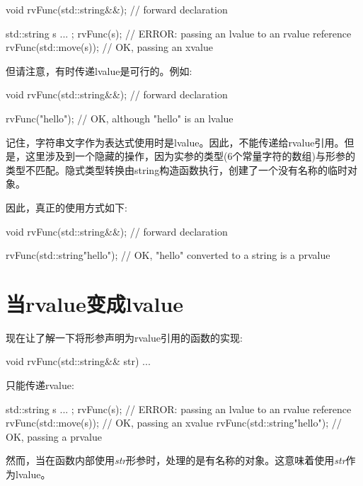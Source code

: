 \begin{codebox}[cpp]
void rvFunc(std::string&&); // forward declaration

std::string s{ ... };
rvFunc(s); // ERROR: passing an lvalue to an rvalue reference
rvFunc(std::move(s)); // OK, passing an xvalue
\end{codebox}

但请注意，有时传递lvalue是可行的。例如:\par

\begin{codebox}[cpp]
void rvFunc(std::string&&); // forward declaration

rvFunc("hello"); // OK, although "hello" is an lvalue
\end{codebox}

记住，字符串文字作为表达式使用时是lvalue。因此，不能传递给rvalue引用。但是，这里涉及到一个隐藏的操作，因为实参的类型(6个常量字符的数组)与形参的类型不匹配。隐式类型转换由string构造函数执行，创建了一个没有名称的临时对象。\par

因此，真正的使用方式如下:\par

\begin{codebox}[cpp]
void rvFunc(std::string&&); // forward declaration

rvFunc(std::string{"hello"}); // OK, "hello" converted to a string is a prvalue
\end{codebox}


\section{当rvalue变成lvalue}

现在让了解一下将形参声明为rvalue引用的函数的实现:\par

\begin{codebox}[cpp]
void rvFunc(std::string&& str) {
  ...
}
\end{codebox}

只能传递rvalue:\par

\begin{codebox}[cpp]
std::string s{ ... };
rvFunc(s); // ERROR: passing an lvalue to an rvalue reference
rvFunc(std::move(s)); // OK, passing an xvalue
rvFunc(std::string{"hello"}); // OK, passing a prvalue
\end{codebox}

然而，当在函数内部使用\textit{str}形参时，处理的是有名称的对象。这意味着使用\textit{str}作为lvalue。\par

